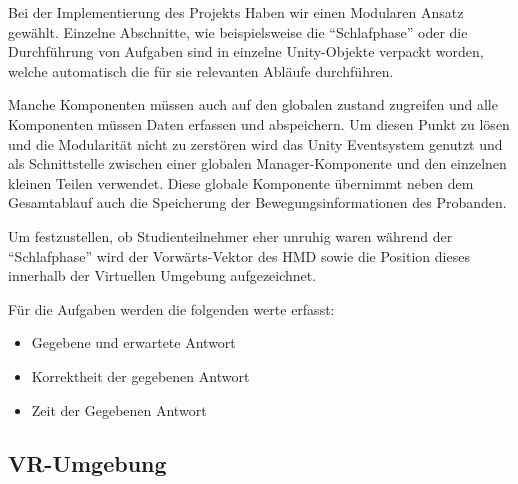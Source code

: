 Bei der Implementierung des Projekts Haben wir einen Modularen Ansatz gewählt. Einzelne Abschnitte, wie beispielsweise die "`Schlafphase"' oder die Durchführung von Aufgaben sind in einzelne Unity-Objekte verpackt worden, welche automatisch die für sie relevanten Abläufe durchführen. 

Manche Komponenten müssen auch auf den globalen zustand zugreifen und alle Komponenten müssen Daten erfassen und abspeichern. Um diesen Punkt zu lösen und die Modularität nicht zu zerstören wird das Unity Eventsystem genutzt und als Schnittstelle zwischen einer globalen Manager-Komponente und den einzelnen kleinen Teilen verwendet. 
Diese globale Komponente übernimmt neben dem Gesamtablauf auch die Speicherung der Bewegungsinformationen des Probanden. 

Um festzustellen, ob Studienteilnehmer eher unruhig waren während der "`Schlafphase"' wird der Vorwärts-Vektor des HMD sowie die Position dieses innerhalb der Virtuellen Umgebung aufgezeichnet.

Für die Aufgaben werden die folgenden werte erfasst:
\begin{itemize}
    \item Gegebene und erwartete Antwort
    \item Korrektheit der gegebenen Antwort
    \item Zeit der Gegebenen Antwort
\end{itemize}

\subsection{VR-Umgebung}
